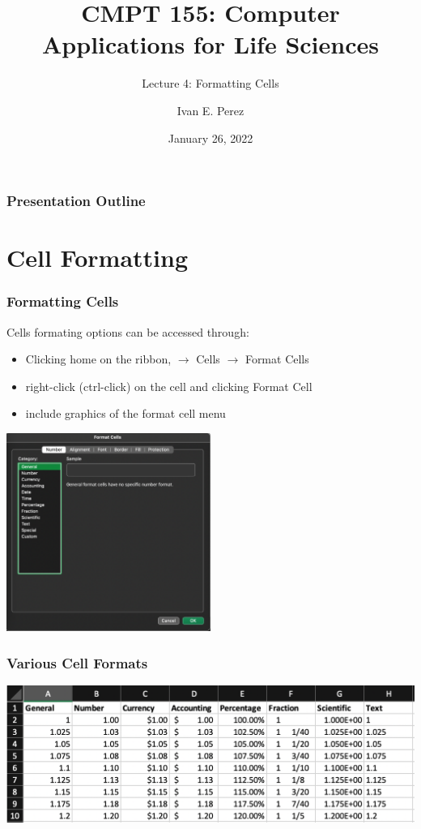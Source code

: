 \documentclass[12pt]{beamer}
\title{CMPT 155: Computer Applications for Life Sciences}
\subtitle{Lecture 4: Formatting Cells}
\author{Ivan E. Perez}
\institute{}
\date{January 26, 2022}
\begin{document}
	\begin{frame}
		\titlepage
	\end{frame}
	\begin{frame}
		\frametitle{Presentation Outline}
		\tableofcontents
	\end{frame}
\section{Cell Formatting}
	\begin{frame}
		\frametitle{Formatting Cells}
			Cells formating options can be accessed through:
		\begin{itemize}
			\item Clicking home on the ribbon, $\rightarrow$ Cells $\rightarrow$ Format Cells
			\item right-click (ctrl-click) on the cell and clicking Format Cell
			\item include graphics of the format cell menu 
		\end{itemize} 
		\begin{center}
			\includegraphics[width=0.5\textwidth]{formatcellsmenu.png}
		\end{center}
	\end{frame}
	\begin{frame}
	\frametitle{Various Cell Formats}
		\begin{center}
			\includegraphics[width=\textwidth]{variouscellformats.png}
		\end{center}
	\end{frame}
\end{document}
